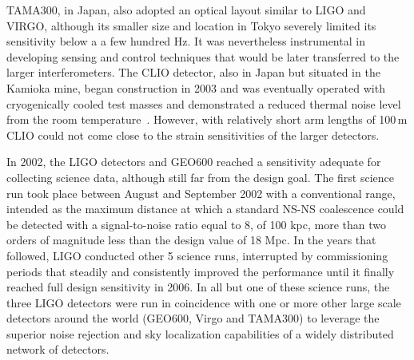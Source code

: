TAMA300\cite{Ando_2002}, in Japan, also adopted an optical layout similar to LIGO and VIRGO, although its smaller size and location in Tokyo severely limited its sensitivity below a a few hundred Hz.
It was nevertheless instrumental in developing sensing and control techniques that would be later transferred to the larger interferometers. 
The CLIO detector, also in Japan but situated in the Kamioka mine, began construction in 2003 and was eventually operated with cryogenically cooled test masses and demonstrated a reduced thermal noise level from the room temperature~\cite{Uchiyama_2012}. However, with relatively short arm lengths of 100\,m CLIO could not come close to the strain sensitivities of the larger detectors.

In 2002, the LIGO detectors and GEO600 reached a sensitivity adequate for collecting science data, although still far from the design goal.
The first science run took place between August and September 2002 with a conventional range, intended as the maximum distance at which a standard NS-NS coalescence could be detected with a signal-to-noise ratio equal to 8, of 100 kpc, more than two orders of magnitude less than the design value of 18 Mpc.
In the years that followed, LIGO conducted other 5 science runs, interrupted by commissioning periods that steadily and consistently improved the performance until it finally reached full design sensitivity in 2006.
In all but one of these science runs, the three LIGO detectors were run in coincidence with one or more other large scale detectors around the world (GEO600, Virgo and TAMA300) to leverage the superior noise rejection and sky localization capabilities of a widely distributed network of detectors\cite{Abbott_2004,Abbott_2005,Abbott_2006,Abbott_2008,Abadie_2010}.

